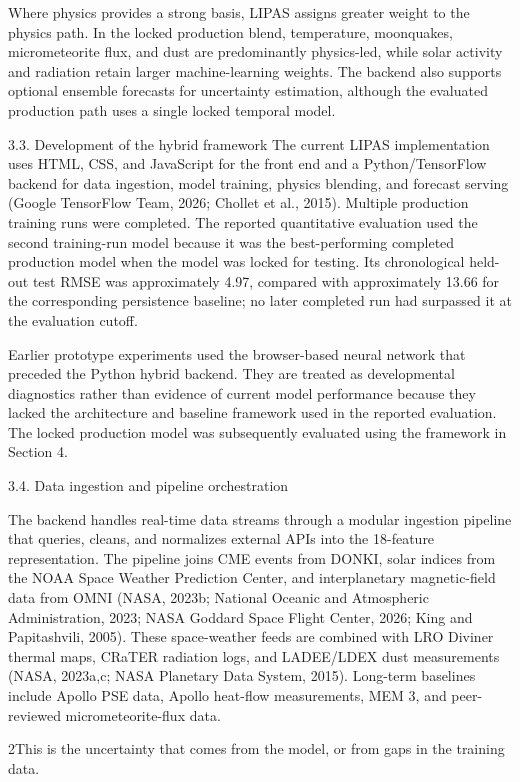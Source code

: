 Where physics provides a strong basis, LIPAS assigns greater weight to the physics path. In the locked production blend, temperature, moonquakes, micrometeorite flux, and dust are predominantly physics-led, while solar activity and radiation retain larger machine-learning weights. The backend also supports optional ensemble forecasts for uncertainty estimation, although the evaluated production path uses a single locked temporal model.

3.3. Development of the hybrid framework The current LIPAS implementation uses HTML, CSS, and JavaScript for the front end and a Python/TensorFlow backend for data ingestion, model training, physics blending, and forecast serving (Google TensorFlow Team, 2026; Chollet et al., 2015). Multiple production training runs were completed. The reported quantitative evaluation used the second training-run model because it was the best-performing completed production model when the model was locked for testing. Its chronological held-out test RMSE was approximately 4.97, compared with approximately 13.66 for the corresponding persistence baseline; no later completed run had surpassed it at the evaluation cutoff.

Earlier prototype experiments used the browser-based neural network that preceded the Python hybrid backend. They are treated as developmental diagnostics rather than evidence of current model performance because they lacked the architecture and baseline framework used in the reported evaluation. The locked production model was subsequently evaluated using the framework in Section 4.

3.4. Data ingestion and pipeline orchestration

The backend handles real-time data streams through a modular ingestion pipeline that queries, cleans, and normalizes external APIs into the 18-feature representation. The pipeline joins CME events from DONKI, solar indices from the NOAA Space Weather Prediction Center, and interplanetary magnetic-field data from OMNI (NASA, 2023b; National Oceanic and Atmospheric Administration, 2023; NASA Goddard Space Flight Center, 2026; King and Papitashvili, 2005). These space-weather feeds are combined with LRO Diviner thermal maps, CRaTER radiation logs, and LADEE/LDEX dust measurements (NASA, 2023a,c; NASA Planetary Data System, 2015). Long-term baselines include Apollo PSE data, Apollo heat-flow measurements, MEM 3, and peer-reviewed micrometeorite-flux data.

2This is the uncertainty that comes from the model, or from gaps in the training data.

